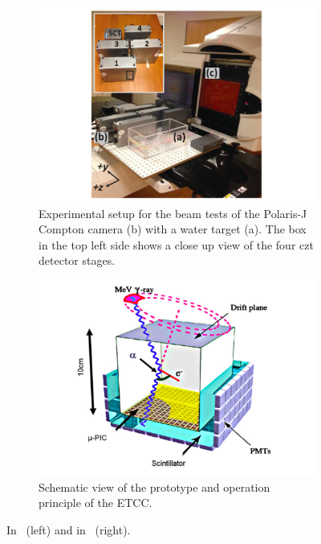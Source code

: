 \begin{figure}
\centering
\begin{subfigure}[t]{.49\textwidth}
\hspace{-0.7cm}\includegraphics[width=1.2\linewidth]{03_GraphicFiles/chapter2_GammaCameras/CC_Polaris.pdf}
\caption{Experimental setup for the beam tests of the Polaris-J Compton camera (b) with a water target (a). The box in the top left side shows a close up view of the four \gls{czt} detector stages.}
\label{chap2::fig::CC_Polaris}
\end{subfigure}
\begin{subfigure}[t]{.49\textwidth}
\hspace{-0.7cm}\includegraphics[width=1.2\linewidth]{03_GraphicFiles/chapter2_GammaCameras/CC_TPC.pdf}
\caption{Schematic view of the prototype and operation principle of the ETCC.}
\label{chap2::fig::CC_TPC}
\end{subfigure}
\caption{In~\cite{Polf2015} (left) and in~\cite{} (right).}
\label{chap2::fig::CC_SemiconGas}
\end{figure}

